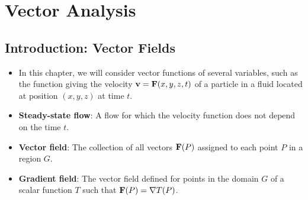 \documentclass[../main.tex]{subfiles}
\begin{document}
\chapter{Vector Analysis}\label{cht:17}
\section{Introduction: Vector Fields}
\begin{itemize}
    \item {}In this chapter, we will consider vector functions of several variables, such as the function giving the velocity $\vb{v}=\vb{F}(x,y,z,t)$ of a particle in a fluid located at position $(x,y,z)$ at time $t$.
    \item \textbf{Steady-state flow}: A flow for which the velocity function does not depend on the time $t$.
    \item \textbf{Vector field}: The collection of all vectors $\vb{F}(P)$ assigned to each point $P$ in a region $G$.
    \item \textbf{Gradient field}: The vector field defined for points in the domain $G$ of a scalar function $T$ such that $\vb{F}(P)=\nabla T(P)$.
\end{itemize}
\end{document}
